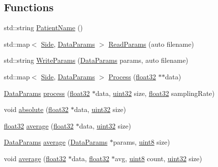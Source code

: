 \subsection*{Functions}
\begin{DoxyCompactItemize}
\item 
std\+::string \hyperlink{namespacevaso_a21e264fa912f7ca3f50e7e412ba1582e}{Patient\+Name} ()
\item 
std\+::map$<$ \hyperlink{namespacevaso_a77c5d9704657d49d456f691ddd8abf7c}{Side}, \hyperlink{structDataParams}{Data\+Params} $>$ \hyperlink{namespacevaso_afc1435dcb9c37b3ccde589738b26c909}{Read\+Params} (auto filename)
\item 
std\+::string \hyperlink{namespacevaso_ad8543c0caabf3836b4a93a78e0d487d1}{Write\+Params} (\hyperlink{structDataParams}{Data\+Params} params, auto filename)
\item 
std\+::map$<$ \hyperlink{namespacevaso_a77c5d9704657d49d456f691ddd8abf7c}{Side}, \hyperlink{structDataParams}{Data\+Params} $>$ \hyperlink{namespacevaso_a0a7aa548b31b50c92be5b08bcb1df9a0}{Process} (\hyperlink{definitions_8hpp_aacdc525d6f7bddb3ae95d5c311bd06a1}{float32} $\ast$$\ast$data)
\item 
\hyperlink{structDataParams}{Data\+Params} \hyperlink{namespacevaso_a8136a2891983f7a41768330e018e3232}{process} (\hyperlink{definitions_8hpp_aacdc525d6f7bddb3ae95d5c311bd06a1}{float32} $\ast$data, \hyperlink{definitions_8hpp_a1134b580f8da4de94ca6b1de4d37975e}{uint32} size, \hyperlink{definitions_8hpp_aacdc525d6f7bddb3ae95d5c311bd06a1}{float32} sampling\+Rate)
\item 
void \hyperlink{namespacevaso_a6ca90add966ce1773fc59a6883e6cd0c}{absolute} (\hyperlink{definitions_8hpp_aacdc525d6f7bddb3ae95d5c311bd06a1}{float32} $\ast$data, \hyperlink{definitions_8hpp_a1134b580f8da4de94ca6b1de4d37975e}{uint32} size)
\item 
\hyperlink{definitions_8hpp_aacdc525d6f7bddb3ae95d5c311bd06a1}{float32} \hyperlink{namespacevaso_ad3205136b1cd04b4c6b9d7be73661796}{average} (\hyperlink{definitions_8hpp_aacdc525d6f7bddb3ae95d5c311bd06a1}{float32} $\ast$data, \hyperlink{definitions_8hpp_a1134b580f8da4de94ca6b1de4d37975e}{uint32} size)
\item 
\hyperlink{structDataParams}{Data\+Params} \hyperlink{namespacevaso_a376413e791defec04a0faf329be1cbf4}{average} (\hyperlink{structDataParams}{Data\+Params} $\ast$params, \hyperlink{definitions_8hpp_adde6aaee8457bee49c2a92621fe22b79}{uint8} size)
\item 
void \hyperlink{namespacevaso_a9d0e5d69685ee494d286db6ece005156}{average} (\hyperlink{definitions_8hpp_aacdc525d6f7bddb3ae95d5c311bd06a1}{float32} $\ast$data, \hyperlink{definitions_8hpp_aacdc525d6f7bddb3ae95d5c311bd06a1}{float32} $\ast$avg, \hyperlink{definitions_8hpp_adde6aaee8457bee49c2a92621fe22b79}{uint8} count, \hyperlink{definitions_8hpp_a1134b580f8da4de94ca6b1de4d37975e}{uint32} size)
$$
\end{DoxyCompactItemize}
